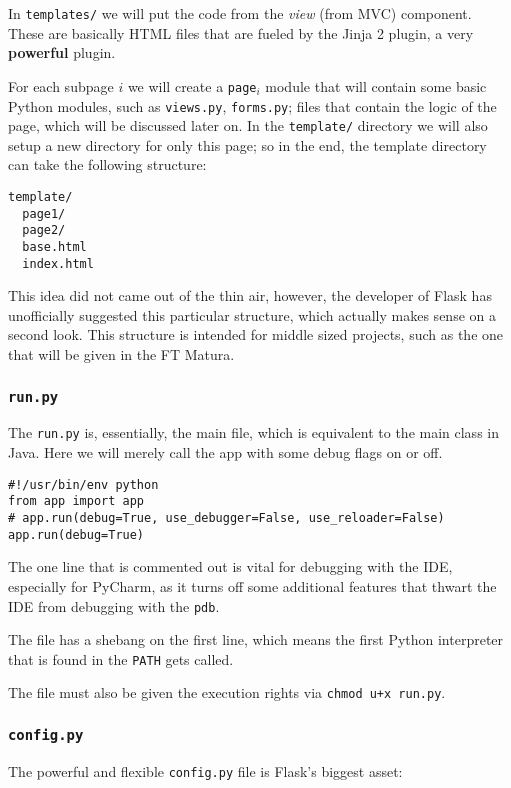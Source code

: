 \documentclass[../main/main.tex]{subfiles}
\begin{document}
In \lstinline|templates/| we will put the code from the \textit{view}
(from MVC) component. These are basically HTML files that are fueled
by the Jinja 2 plugin, a very \textbf{powerful} plugin. 

For each subpage $i$ we will create a \lstinline|page|$_i$ module that
will contain some basic Python modules, such as \lstinline|views.py|,
\lstinline|forms.py|; files that contain the logic of the page, which
will be discussed later on. In the \lstinline|template/| directory we
will also setup a new directory for only this page; so in the end, the
template directory can take the following structure: 

\begin{lstlisting}
template/
  page1/
  page2/
  base.html
  index.html
\end{lstlisting}

This idea did not came out of the thin air, however, the developer of
Flask has unofficially suggested \cite{mitsuhiko:flask} this particular structure, which
actually makes sense on a second look. This structure is intended for
middle sized projects, such as the one that will be given in the FT
Matura. 

\subsubsection{\lstinline|run.py|}

The \lstinline|run.py| is, essentially, the main file, which is
equivalent to the main class in Java. Here we will merely call the app
with some debug flags on or off. 

\begin{lstlisting}
#!/usr/bin/env python
from app import app
# app.run(debug=True, use_debugger=False, use_reloader=False)
app.run(debug=True)
\end{lstlisting}

The one line that is commented out is vital for debugging with the
IDE, especially for PyCharm, as it turns off some additional features
that thwart the IDE from debugging with the \lstinline|pdb|. 

The file has a shebang on the first line, which means the first Python
interpreter that is found in the \lstinline|PATH| gets called. 

The file must also be given the execution rights via \lstinline|chmod u+x run.py|. 

\subsubsection{\lstinline|config.py|}
\label{sec:config.py}
The powerful and flexible \lstinline|config.py| file is Flask's
biggest asset: 
\end{document}
